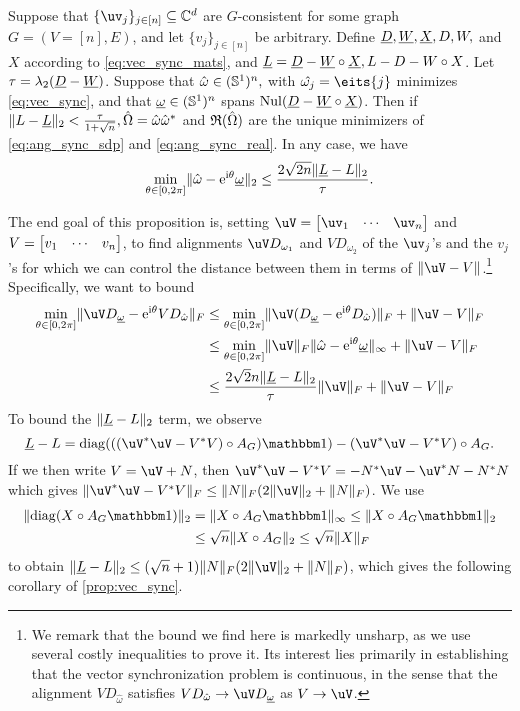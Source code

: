 \begin{proposition}
  Suppose that $\{\uv_j\}_{j \in [n]} \subset \Cd$ are $G$-consistent for some graph $G = (V = [n], E)$, and let $\{v_j\}_{j \in [n]}$ be arbitrary.  Define $\underline{D}, \underline{W}, \underline{X}, D, W,$ and $X$ according to \eqref{eq:vec_sync_mats}, and $\underline{L} = \underline{D} - \underline{W} \circ \underline{X}, L - D - W \circ X$.  Let $\tau = \lambda_2(\underline{D} - \underline{W})$.  Suppose that $\hat{\omega} \in (\mathbb{S}^1)^n,$ with $\hat{\omega_j} = \eits{j}$ minimizes \eqref{eq:vec_sync}, and that $\underline{\omega} \in (\mathbb{S}^1)^n$ spans $\operatorname{Nul}(\underline{D} - \underline{W} \circ \underline{X})$.  Then if $\lVert L - \underline{L}\rVert_2 < \frac{\tau}{1 + \sqrt{n}}, \hat{\Omega} = \hat{\omega} \hat{\omega}^*$ and $\mathfrak{R}(\hat{\Omega})$ are the unique minimizers of  \eqref{eq:ang_sync_sdp} and \eqref{eq:ang_sync_real}.  In any case, we have \[\min_{\theta \in [0, 2\pi]} \lVert\hat{\omega} - \mathrm{e}^{\mathrm{i} \theta} \underline{\omega}\rVert_2 \le \dfrac{2 \sqrt{2 n} \lVert\underline{L} - L\rVert_2}{\tau}.\]
  \label{prop:vec_sync}
\end{proposition}
The end goal of this proposition is, setting $\uV = \rowmat{\uv}{1}{n}$ and $V = \begin{bmatrix} v_{1} & \cdots & v_{n} \end{bmatrix}$, to find alignments $\uV D_{\omega_1}$ and $V D_{\omega_2}$ of the $\uv_j$'s and the $v_j$'s for which we can control the distance between them in terms of $\norm{\uV - V}$.\footnote{We remark that the bound we find here is markedly unsharp, as we use several costly inequalities to prove it.  Its interest lies primarily in establishing that the vector synchronization problem is continuous, in the sense that the alignment $V D_{\hat{\omega}}$ satisfies $V D_{\hat{\omega}} \to \uV D_{\underline{\omega}}$ as $V \to \uV$.}  Specifically, we want to bound
\begin{align*}
  \mintheta \norm{\uV D_{\underline{\omega}} - \eit V D_{\hat{\omega}}}_F &\le \mintheta \norm{\uV (D_{\underline{\omega}} - \eit D_{\hat{\omega}})}_F + \norm{\uV - V}_F \\
  &\le \mintheta \norm{\uV}_F \norm{\hat{\omega} - \eit \underline{\omega}}_\infty + \norm{\uV - V}_F \\
  &\le \dfrac{2 \sqrt{2} n \norm{\uL - L}_2}{\tau} \norm{\uV}_F + \norm{\uV - V}_F
\end{align*}
To bound the $\lVert\underline{L} - L\rVert_2$ term, we observe \[\uL - L = \diag(((\uV^* \uV - V^* V) \circ A_G) \one) - (\uV^* \uV - V^* V) \circ A_G.\]  If we then write $V = \uV + N$, then $\uV^* \uV - V^* V = - N^* \uV - \uV^* N - N^*N$ which gives $\norm{\uV^* \uV - V^* V}_F \le \norm{N}_F(2 \norm{\uV}_2 + \norm{N}_F)$.  We use \[\begin{aligned}\norm{\diag(X \circ A_G \one)}_2 &= \norm{X \circ A_G \one}_\infty \le \norm{X \circ A_G \one}_2 \\ &\le \sqrt{n} \norm{X \circ A_G}_2 \le \sqrt{n} \norm{X}_F\end{aligned}\] to obtain $\norm{\uL - L}_2 \le (\sqrt{n} + 1) \norm{N}_F(2 \norm{\uV}_2 + \norm{N}_F)$, which gives the following corollary of \cref{prop:vec_sync}.


